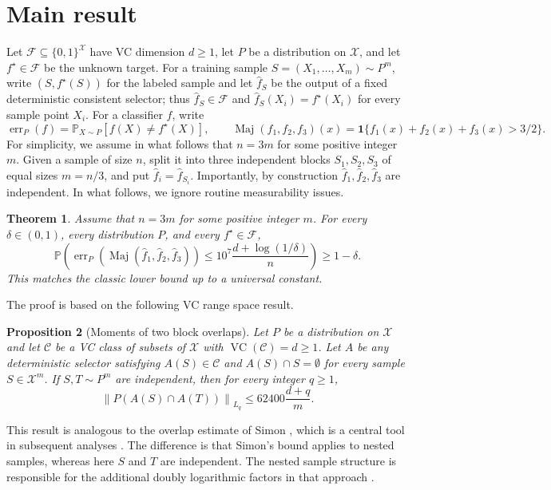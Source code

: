 \documentclass[11pt]{article}
\newcommand{\X}{\mathcal X}
\newcommand{\F}{\mathcal F}
\newcommand{\C}{\mathcal C}
\newcommand{\Prb}{\mathbb P}
\newcommand{\1}{\mathbf 1}
\newcommand{\err}{\operatorname{err}}
\newcommand{\Maj}{\operatorname{Maj}}
\newcommand{\vc}{\operatorname{VC}}
\theoremstyle{plain}
\newtheorem{theorem}{Theorem}[section]
\newtheorem{proposition}[theorem]{Proposition}
\theoremstyle{remark}
\begin{document}
\section{Main result}

Let $\F\subseteq\{0,1\}^{\X}$ have VC dimension $d\ge 1$, let $P$ be a distribution on $\X$, and let $f^\star\in\F$ be the unknown target.  For a training sample $S=(X_1,\ldots,X_m)\sim P^m$, write $(S,f^\star(S))$ for the labeled sample and let $\widehat f_S$ be the output of a fixed deterministic consistent selector; thus $\widehat f_S\in\F$ and $\widehat f_S(X_i)=f^\star(X_i)$ for every sample point $X_i$.  For a classifier $f$, write
\[
\err_P(f)=\Prb_{X\sim P}\left[f(X)\ne f^\star(X)\right],
\qquad
\Maj(f_1,f_2,f_3)(x)=\1\{f_1(x)+f_2(x)+f_3(x)>3/2\}.
\]
For simplicity, we assume in what follows that $n = 3m$ for some positive integer $m$. Given a sample of size $n$, split it into three independent blocks $S_1,S_2,S_3$ of equal sizes $m = n/3$, and put $\widehat f_i=\widehat f_{S_i}$.  Importantly, by construction $\widehat f_1, \widehat f_2, \widehat f_3$ are independent. In what follows, we ignore routine measurability issues. 

\begin{theorem}\label{thm:main}
Assume that $n = 3m$ for some positive integer $m$. For every $\delta\in(0,1)$, every distribution $P$, and every $f^\star \in \F$,
\[
\Prb\left(\err_P\left(\Maj(\widehat f_1,\widehat f_2,\widehat f_3)\right)
\le 10^7\frac{d+\log(1/\delta)}{n}\right)\ge 1-\delta .
\]
This matches the classic lower bound \cite{ehrenfeucht1989general} up to a universal constant. 
\end{theorem}

The proof is based on the following VC range space result.
\begin{proposition}[Moments of two block overlaps]
\label{prop:moment}
Let $P$ be a distribution on $\X$ and let $\C$ be a VC class of subsets of $\X$ with $\vc(\C)=d\ge1$.  Let $A$ be any deterministic selector satisfying $A(S)\in\C$ and $A(S)\cap S=\emptyset$ for every sample $S\in\X^m$.  If $S,T\sim P^m$ are independent, then for every integer $q\ge 1$,
\[
\left\|P(A(S)\cap A(T))\right\|_{L_q}
\le 62400\frac{d+q}{m}.
\]
\end{proposition}
This result is analogous to the overlap estimate of Simon \cite{Simon2015}, which is a central tool in subsequent analyses
\cite{Hanneke2016,Larsen2023Bagging,AdenAliHogsgaardLarsenZhivotovskiy2024}. The difference is that Simon's bound applies to nested samples, whereas here
$S$ and $T$ are independent. The nested sample structure is responsible for the additional doubly logarithmic factors in that approach \cite{AdenAliHogsgaardLarsenZhivotovskiy2024}.
\end{document}
